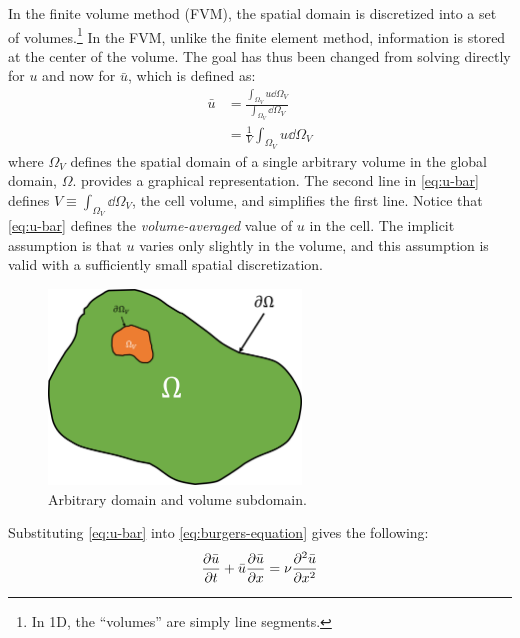 In the finite volume method (FVM), the spatial domain is discretized into a set of volumes.\footnote{In 1D, the ``volumes'' are simply line segments.}
In the FVM, unlike the finite element method, information is stored at the center of the volume.
The goal has thus been changed from solving directly for $u$ and now for $\bar{u}$, which is defined as:
\begin{equation}
	\label{eq:u-bar}
	\begin{split}
		\bar{u}&=\frac{\int_{\Omega_V} u \dd \Omega_V }{\int_{\Omega_V}\dd \Omega_V }\\
		&=\frac{1}{V}\int_{\Omega_V} u \dd \Omega_V
	\end{split}
\end{equation}
where $\Omega_V$ defines the spatial domain of a single arbitrary volume in the global domain, $\Omega$.
 provides a graphical representation.
The second line in \cref{eq:u-bar} defines $V\equiv\int_{\Omega_V}\dd \Omega_V $, the cell volume, and simplifies the first line.
Notice that \cref{eq:u-bar} defines the \textit{volume-averaged} value of $u$ in the cell.
The implicit assumption is that $u$ varies only slightly in the volume, and this assumption is valid with a sufficiently small spatial discretization.
\begin{figure}
	\centering
	\includegraphics[width=0.6\textwidth]{figures/domain_subdomain}
	\caption{Arbitrary domain and volume subdomain.}
	\label{fig:domain and subdomain}
\end{figure}
Substituting \cref{eq:u-bar} into \cref{eq:burgers-equation} gives the following:
\begin{equation}
	\label{eq:u-averaged-burgers}
	\pdv{\bar{u}}{t} + \bar{u}\pdv{\bar{u}}{x} = \nu \pdv[2]{\bar{u}}{x}
\end{equation}

